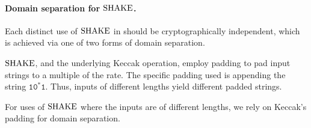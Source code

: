 %

\paragraph{Domain separation for $\textrm{\upshape\mdseries SHAKE}$.}
Each distinct use of $\textrm{\upshape\mdseries SHAKE}$ in \FrodoKEM should be cryptographically independent, which is achieved via one of two forms of domain separation.  

$\textrm{\upshape\mdseries SHAKE}$, and the underlying Keccak operation, employ padding to pad input strings to a multiple of the rate.  The specific padding used is appending the string $\mathtt{10^*1}$.  Thus, inputs of different lengths yield different padded strings.  

For uses of $\textrm{\upshape\mdseries SHAKE}$ where the inputs are of different lengths, we rely on Keccak's padding for domain separation.

